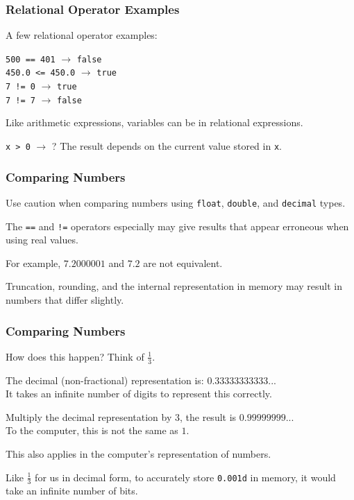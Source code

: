 \begin{frame}
\frametitle{Relational Operator Examples}
A few relational operator examples:

\texttt{500 == 401} $\rightarrow$ \texttt{false}\\
\texttt{450.0 <= 450.0} $\rightarrow$ \texttt{true}\\
\texttt{7 != 0} $\rightarrow$ \texttt{true}\\
\texttt{7 != 7} $\rightarrow$ \texttt{false}

Like arithmetic expressions, variables can be in relational expressions.

\texttt{x > 0} $\rightarrow$ ? The result depends on the current value stored in \texttt{x}.

\end{frame}

\begin{frame}
\frametitle{Comparing Numbers}

Use caution when comparing numbers using \texttt{float}, \texttt{double}, and \texttt{decimal} types.

The \texttt{==} and \texttt{!=} operators especially may give results that appear erroneous when using real values.

For example, $7.2000001$ and $7.2$ are not equivalent.

Truncation, rounding, and the internal representation in memory may result in numbers that differ slightly.

\end{frame}


\begin{frame}
\frametitle{Comparing Numbers}

How does this happen? Think of $\frac{1}{3}$.

The decimal (non-fractional) representation is: $0.33333333333...$\\
\quad It takes an infinite number of digits to represent this correctly.

Multiply the decimal representation by 3, the result is $0.99999999...$\\
\quad To the computer, this is not the same as $1$.

This also applies in the computer's representation of numbers. 

Like $\frac{1}{3}$ for us in decimal form, to accurately store \texttt{0.001d} in memory, it would take an infinite number of bits.

\end{frame}


